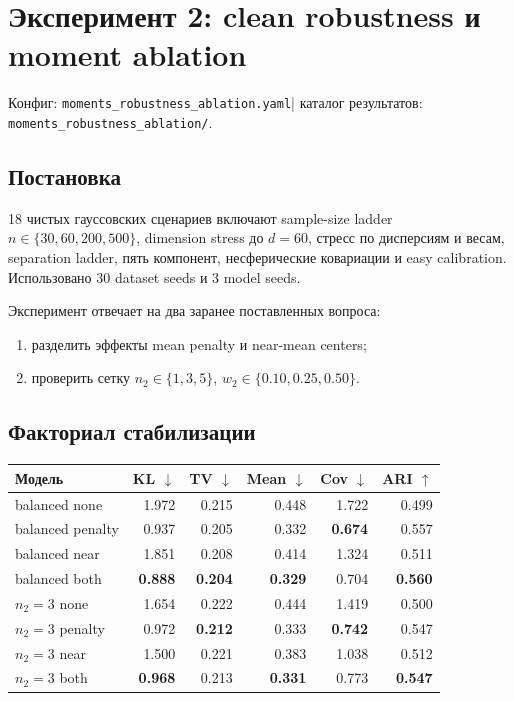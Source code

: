 \documentclass[11pt,a4paper]{article}
\newcommand{\code}[1]{{\footnotesize\nolinkurl{#1}}}
\newcommand{\best}[1]{\textbf{\color{green}#1}}
\newcommand{\configlink}[1]{%
  \code{#1.yaml}}
\newcommand{\resultslink}[1]{%
  \code{#1/}}
\newcommand{\runrefs}[1]{%
  \small\color{midgray}%
  Конфиг: \configlink{#1}\enspace|\enspace
  каталог результатов: \resultslink{#1}.%
  \normalsize\color{black}}
\begin{document}
\section{Эксперимент 2: clean robustness и moment ablation}

\runrefs{moments_robustness_ablation}

\subsection{Постановка}

18 чистых гауссовских сценариев включают sample-size ladder
$n\in\{30,60,200,500\}$, dimension stress до $d=60$, стресс по дисперсиям и
весам, separation ladder, пять компонент, несферические ковариации и easy
calibration. Использовано 30 dataset seeds и 3 model seeds.

Эксперимент отвечает на два заранее поставленных вопроса:

\begin{enumerate}
  \item разделить эффекты mean penalty и near-mean centers;
  \item проверить сетку $n_2\in\{1,3,5\}$,
        $w_2\in\{0.10,0.25,0.50\}$.
\end{enumerate}

\subsection{Факториал стабилизации}

\begin{center}
\small
\begin{tabular}{@{}lrrrrr@{}}
\toprule
\rowcolor{lightgray}
\textbf{Модель} & \textbf{KL} $\downarrow$ & \textbf{TV} $\downarrow$ &
\textbf{Mean} $\downarrow$ & \textbf{Cov} $\downarrow$ & \textbf{ARI} $\uparrow$\\
\midrule
balanced none & 1.972 & 0.215 & 0.448 & 1.722 & 0.499\\
balanced penalty & 0.937 & 0.205 & 0.332 & \best{0.674} & 0.557\\
balanced near & 1.851 & 0.208 & 0.414 & 1.324 & 0.511\\
balanced both & \best{0.888} & \best{0.204} & \best{0.329} & 0.704 & \best{0.560}\\
\midrule
$n_2=3$ none & 1.654 & 0.222 & 0.444 & 1.419 & 0.500\\
$n_2=3$ penalty & 0.972 & \best{0.212} & 0.333 & \best{0.742} & 0.547\\
$n_2=3$ near & 1.500 & 0.221 & 0.383 & 1.038 & 0.512\\
$n_2=3$ both & \best{0.968} & 0.213 & \best{0.331} & 0.773 & \best{0.547}\\
\bottomrule
\end{tabular}
\end{center}
\end{document}
